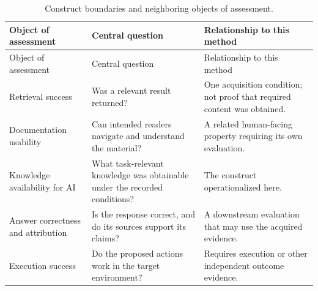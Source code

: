 \documentclass[manuscript,review,anonymous]{acmart}
\begin{document}
\begin{longtable}[]{@{}
  >{\raggedright\arraybackslash}p{}
  >{\raggedright\arraybackslash}p{}
  >{\raggedright\arraybackslash}p{}@{}}
\caption{Construct boundaries and neighboring objects of assessment.}\tabularnewline
\toprule\noalign{}
\begin{minipage}[b]{\linewidth}\raggedright
Object of assessment
\end{minipage} & \begin{minipage}[b]{\linewidth}\raggedright
Central question
\end{minipage} & \begin{minipage}[b]{\linewidth}\raggedright
Relationship to this method
\end{minipage} \\
\midrule\noalign{}
\endfirsthead
\toprule\noalign{}
\begin{minipage}[b]{\linewidth}\raggedright
Object of assessment
\end{minipage} & \begin{minipage}[b]{\linewidth}\raggedright
Central question
\end{minipage} & \begin{minipage}[b]{\linewidth}\raggedright
Relationship to this method
\end{minipage} \\
\midrule\noalign{}
\endhead
\bottomrule\noalign{}
\endlastfoot
Retrieval success & Was a relevant result returned? & One acquisition condition; not proof that required content was obtained. \\
Documentation usability & Can intended readers navigate and understand the material? & A related human-facing property requiring its own evaluation. \\
Knowledge availability for AI & What task-relevant knowledge was obtainable under the recorded conditions? & The construct operationalized here. \\
Answer correctness and attribution & Is the response correct, and do its sources support its claims? & A downstream evaluation that may use the acquired evidence. \\
Execution success & Do the proposed actions work in the target environment? & Requires execution or other independent outcome evidence. \\
\end{longtable}
\end{document}
